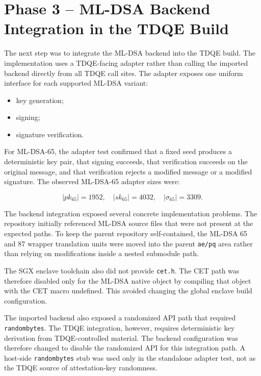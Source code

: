 \section{Phase 3 -- ML-DSA Backend Integration in the TDQE Build}

The next step was to integrate the ML-DSA backend into the TDQE build. The
implementation uses a TDQE-facing adapter rather than calling the imported
backend directly from all TDQE call sites. The adapter exposes one uniform
interface for each supported ML-DSA variant:

\begin{itemize}
  \item key generation;
  \item signing;
  \item signature verification.
\end{itemize}

For ML-DSA-65, the adapter test confirmed that a fixed seed produces a
deterministic key pair, that signing succeeds, that verification succeeds on
the original message, and that verification rejects a modified message or a
modified signature. The observed ML-DSA-65 adapter sizes were:

\begin{equation}
  |pk_{65}| = 1952,\quad |sk_{65}| = 4032,\quad |\sigma_{65}| = 3309.
\end{equation}

The backend integration exposed several concrete implementation problems. The
repository initially referenced ML-DSA source files that were not present at
the expected paths. To keep the parent repository self-contained, the ML-DSA
65 and 87 wrapper translation units were moved into the parent
\texttt{ae/pq} area rather than relying on modifications inside a nested
submodule path.

The SGX enclave toolchain also did not provide \texttt{cet.h}. The CET path
was therefore disabled only for the ML-DSA native object by compiling that
object with the CET macro undefined. This avoided changing the global enclave
build configuration.

The imported backend also exposed a randomized API path that required
\texttt{randombytes}. The TDQE integration, however, requires deterministic
key derivation from TDQE-controlled material. The backend configuration was
therefore changed to disable the randomized API for this integration path. A
host-side \texttt{randombytes} stub was used only in the standalone adapter
test, not as the TDQE source of attestation-key randomness.

